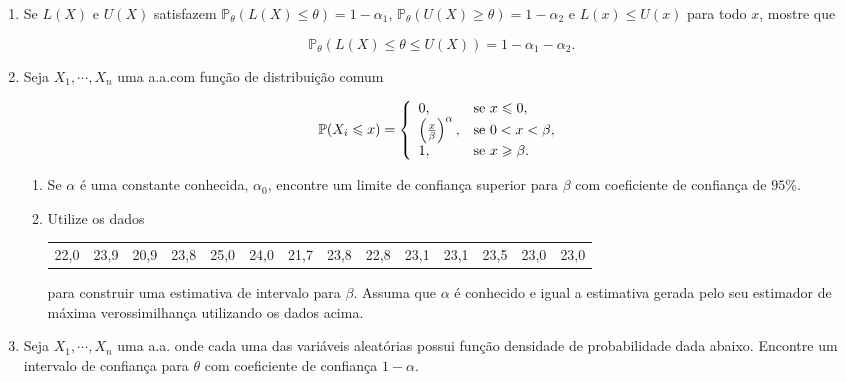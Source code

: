 \documentclass[10pt,brazil,addpoints]{exam}
\newcommand{\prob}{\mathbb{P}}
\begin{document}
\begin{enumerate}[1.]

\item Se $L(X)$ e $U(X)$ satisfazem $\prob_\theta(L(X)\leqslant\theta)=1-\alpha_1$, $\prob_\theta(U(X)\geqslant\theta)=1-\alpha_2$ e $L(x) \leqslant U(x)$ para todo $x$, mostre que

\[\prob_\theta(L(X)\leqslant\theta\leqslant U(X))=1-\alpha_1-\alpha_2.\]




\item 
Seja $X_1,\cdots,X_n$ uma a.a.com função de distribuição comum

\[\prob(X_i\leqslant x)=\left\{
                          \begin{array}{ll}
                            0, & \hbox{se }x\leqslant0, \\
                            \left(\frac{x}{\beta}\right)^\alpha, & \hbox{se }0<x<\beta, \\
                            1, & \hbox{se }x\geqslant\beta.
                          \end{array}
                        \right.
\]

\begin{enumerate}[\bf (a)]
\item Se $\alpha$ é uma constante conhecida, $\alpha_0$, encontre um limite de confiança superior para $\beta$ com coeficiente de confiança de $95\%$.

\item Utilize os dados
\begin{tabular}{cccccccccccccc}
 22,0 & 23,9 & 20,9 & 23,8 & 25,0 & 24,0 & 21,7 & 23,8 & 22,8 & 23,1 & 23,1 & 23,5 & 23,0 & 23,0 \\
\end{tabular}

\noindent para construir uma estimativa de intervalo para $\beta$. Assuma que $\alpha$ é conhecido e igual a estimativa gerada pelo seu estimador de máxima verossimilhança utilizando os dados acima.
\end{enumerate}

 \item  Seja $X_1,\cdots,X_{n}$ uma a.a. onde cada uma das variáveis aleatórias possui função densidade de probabilidade dada abaixo. Encontre um intervalo de confiança para $\theta$ com coeficiente de confiança $1-\alpha$.


\end{enumerate}
\end{document}
